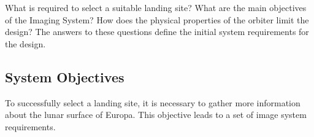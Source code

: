 What is required to select a suitable landing site? What are the main objectives of the Imaging System? How does the physical properties of the orbiter limit the design? The answers to these questions define the initial system requirements for the design.
\subsection{System Objectives}
To successfully select a landing site, it is necessary to gather more information about the lunar surface of Europa. This objective leads to a set of image system requirements.
